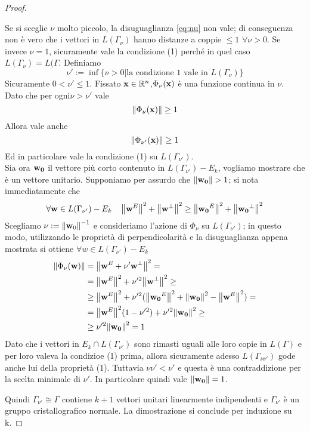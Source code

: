 \documentclass[a4paper,11pt,openright,twoside	]{book}
\begin{document}
\begin{proof}
\begin{itemize}
Se si sceglie $\nu$ molto piccolo, la disuguaglianza \ref{eq:nu}  non vale; di conseguenza non è vero che i vettori in  $L(\Gamma_{\nu})$ hanno distanze a coppie $\leq 1$ $\forall \nu >0$. Se invece $\nu = 1 $, sicuramente vale la condizione (1) perché in quel caso $L(\Gamma_{\nu}) = L(\Gamma $. 
Definiamo 
\[ \nu' := \inf \{\nu >0 | \textrm{la condizione 1 vale in }  L(\Gamma_{\nu}) \} \]
Sicuramente $0 < \nu' \leq 1$. Fissato $\vb{x} \in \mathbb{R}^n$,$\Phi_{\nu}(\vb{x}) $ è una funzione continua in $\nu$. \\
Dato che per ogni$\nu > \nu ' $ vale 
\[ \norm{\Phi_{\nu}(\vb{x})} \geq 1 \]
Allora vale anche 
\[ \norm{\Phi_{\nu'}(\vb{x})} \geq 1  \]
Ed in particolare vale la condizione (1) su $L(\Gamma_{\nu'})$. \\
Sia ora $\vb{w_0}$ il vettore più corto contenuto in $L(\Gamma_{\nu'}) - E_k$, vogliamo mostrare che è un vettore unitario. 
Supponiamo per assurdo che $\norm{\vb{w_0}} > 1$; si nota immediatamente che 
\[ \forall \vb{w} \in L(\Gamma_{\nu'}) - E_k \; \; \; \; \norm{\vb{w}^E}^2 + \norm{\vb{w}^{\perp}}^2 \geq \norm{\vb{w_0}^E}^2 + \norm{\vb{w_0}^{\perp}}^2 \]
Scegliamo $\nu := \norm{\vb{w}_0}^{-1}$ e consideriamo l'azione di $\Phi_{\nu}$ su $L(\Gamma_{\nu'})$; in questo modo, utilizzando le proprietà di perpendicolarità e la disuguaglianza appena mostrata si ottiene $\forall w \in L(\Gamma_{\nu'}) - E_k$
\[ \begin{split}
\norm{\Phi_{\nu}(\vb{w})} & = \norm{\vb{w}^E  + \nu' \vb{w}^{\perp}}^2 = \\
 & =  \norm{\vb{w}^E}^2 + \nu'^2 \norm{\vb{w}^{\perp}}^2 \geq \\
 & \geq \norm{\vb{w}^E}^2 + \nu'^2 (\norm{\vb{w_0}^E}^2 + \norm{\vb{w_0}}^2 - \norm{\vb{w}^E}^2  ) = \\
 & = \norm{\vb{w}^E}^2 (1 - \nu'^2)   + \nu'^2 \norm{\vb{w_0}}^2 \geq \\
 & \geq \nu'^2  \norm{\vb{w_0}}^2 = 1 
\end{split}
\]
Dato che i vettori in $E_k \cap L(\Gamma_{\nu'})$ sono rimasti uguali alle loro copie in $L(\Gamma)$ e per loro valeva la condizioe (1) prima, allora sicuramente adesso $L(\Gamma_{\nu \nu'})$ gode anche lui della proprietà (1). 
Tuttavia $\nu \nu'< \nu'$ e questa è una contraddizione per la scelta minimale di $\nu'$.
In particolare quindi vale $\norm{\vb{w_0}} = 1$. 
\end{itemize}
Quindi  $\Gamma_{\nu'} \cong \Gamma$ contiene $k+1$ vettori unitari linearmente indipendenti e $\Gamma_{\nu'}$ è un gruppo cristallografico normale.  
La dimostrazione si conclude per induzione su k. 
\end{proof}
\end{document}
